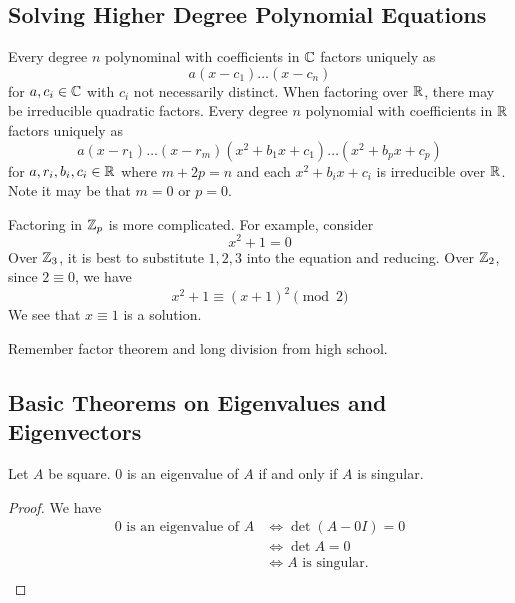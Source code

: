 \documentclass{article}
\begin{document}
\subsection{Solving Higher Degree Polynomial Equations}
\begin{cthm}
  Every degree $n$ polynominal with coefficients in $\mathbb{C}$ factors uniquely as \[
    a(x-c_1)\dots(x-c_n)
  \]
  for $a, c_i \in \mathbb{C}$ with $c_i$ not necessarily distinct. When factoring over $\mathbb{R}$, there may be irreducible quadratic factors. Every degree $n$ polynomial with coefficients in $\mathbb{R}$ factors uniquely as \[
    a(x-r_1)\dots(x-r_m)(x^2 + b_1x+c_1) \dots(x^2 + b_px + c_p)
  \]
  for $a, r_i, b_i, c_i \in \mathbb{R}$ where $m+2p = n$ and each $x^2 + b_ix + c_i$ is irreducible over $\mathbb{R}$. Note it may be that $m = 0$ or $p = 0$.
\end{cthm}
\begin{theorem}
  Factoring in $\mathbb{Z}_p$ is more complicated. For example, consider \[
    x^2 + 1 = 0
  \]
  Over $\mathbb{Z}_3$, it is best to substitute $1, 2, 3$ into the equation and reducing. Over $\mathbb{Z}_2$, since $2 \equiv 0$, we have \[
    x^2 + 1 \equiv (x+1)^2 \pmod{2}
  \]
  We see that $x \equiv 1$ is a solution.
\end{theorem}
\begin{remark}
  Remember factor theorem and long division from high school.
\end{remark}
\subsection{Basic Theorems on Eigenvalues and Eigenvectors}
\begin{theorem}
  Let $A$ be square. $0$ is an eigenvalue of $A$ if and only if $A$ is singular.
\end{theorem}
\begin{proof}
  We have
  \begin{align*}
    0 \text{ is an eigenvalue of }A & \iff \det (A - 0I) = 0      \\
                                    & \iff \det A = 0             \\
                                    & \iff A \text{ is singular.} \\
  \end{align*}
\end{proof}
\end{document}
